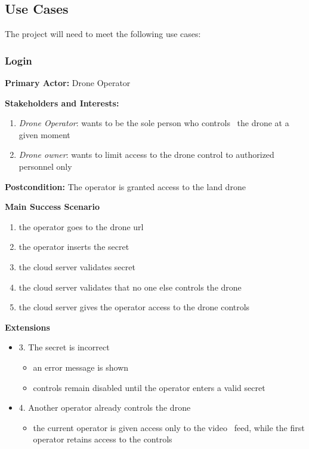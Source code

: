 \subsection{Use Cases}
\label{subsec:use-cases}
The project will need to meet the following use cases:

\subsubsection{\textbf{Login}}

\textbf{Primary Actor:} Drone Operator

\textbf{Stakeholders and Interests:}
\begin{enumerate}
    \item \textit{Drone Operator}: wants to be the sole person who controls \
            the drone at a given moment
    \item \textit{Drone owner}: wants to limit access to the drone control to authorized personnel only
\end{enumerate}

\textbf{Postcondition:} The operator is granted access to the land drone

\textbf{Main Success Scenario}
\begin{enumerate}
    \item the operator goes to the drone url
    \item the operator inserts the secret
    \item the cloud server validates secret
    \item the cloud server validates that no one else controls the drone
    \item the cloud server gives the operator access to the drone controls
\end{enumerate}

\textbf{Extensions}
\begin{itemize}
    \item 3. The secret is incorrect
        \begin{itemize}
            \item an error message is shown
            \item controls remain disabled until the operator enters a valid secret
        \end{itemize}
    \item 4. Another operator already controls the drone
        \begin{itemize}
            \item the current operator is given access only to the video \
                    feed, while the first operator retains access to the controls
        \end{itemize}
\end{itemize}

